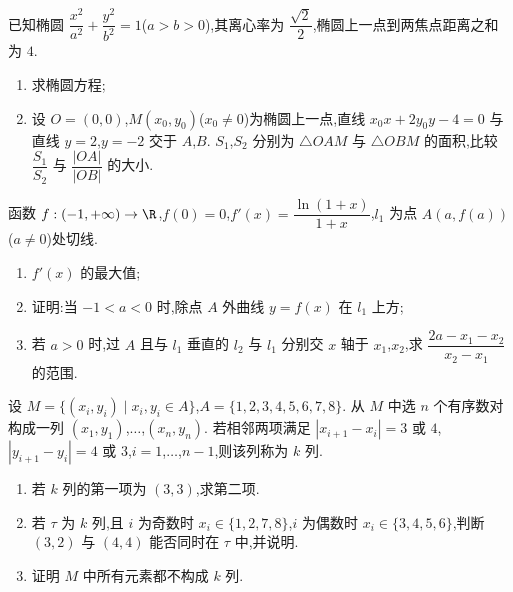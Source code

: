\begin{problem}
已知椭圆 \(\dfrac{x^2}{a^2}+\dfrac{y^2}{b^2}=1\)(\(a>b>0\)),其离心率为 \(\dfrac{\sqrt{2}}{2}\),椭圆上一点到两焦点距离之和为 \(4\).

\begin{enumerate}
\item 求椭圆方程;
\item 设 \(O=(0,0)\),\(M(x_0,y_0)\)(\(x_0\ne0\))为椭圆上一点,直线 \(x_0x+2y_0y-4=0\) 与直线 \(y=2\),\(y=-2\) 交于 \(A\),\(B\). \(S_1\),\(S_2\) 分别为 \(\triangle OAM\) 与 \(\triangle OBM\) 的面积,比较 \(\dfrac{S_1}{S_2}\) 与 \(\dfrac{|OA|}{|OB|}\) 的大小.
\end{enumerate}
\end{problem}

\begin{problem}
函数 \(f:(-1,+\infty)\to\R\),\(f(0)=0\),\(f'(x)=\dfrac{\ln(1+x)}{1+x}\),\(l_1\) 为点 \(A(a,f(a))\)(\(a\ne0\))处切线.

\begin{enumerate}
    \item \(f'(x)\) 的最大值;
    \item 证明:当 \(-1<a<0\) 时,除点 \(A\) 外曲线 \(y=f(x)\) 在 \(l_1\) 上方;
    \item 若 \(a>0\) 时,过 \(A\) 且与 \(l_1\) 垂直的 \(l_2\) 与 \(l_1\) 分别交 \(x\) 轴于 \(x_1\),\(x_2\),求 \(\dfrac{2a-x_1-x_2}{x_2-x_1}\) 的范围.
\end{enumerate}
\end{problem}

\begin{problem}
设 \(M=\{(x_i,y_i)\mid x_i,y_i\in A\}\),\(A=\{1,2,3,4,5,6,7,8\}\). 从 \(M\) 中选 \(n\) 个有序数对构成一列 \((x_1,y_1)\),\(\dots\),\((x_n,y_n)\). 若相邻两项满足 \(|x_{i+1}-x_i|=3\text{\ 或\ }4\),\(|y_{i+1}-y_i|=4\text{\ 或\ }3\),\(i=1\),\(\dots\),\(n-1\),则该列称为 \(k\) 列.

\begin{enumerate}
    \item 若 \(k\) 列的第一项为 \((3,3)\),求第二项.
    \item 若 \(\tau\) 为 \(k\) 列,且 \(i\) 为奇数时 \(x_i\in\{1,2,7,8\}\),\(i\) 为偶数时 \(x_i\in\{3,4,5,6\}\),判断 \((3,2)\) 与 \((4,4)\) 能否同时在 \(\tau\) 中,并说明.
    \item 证明 \(M\) 中所有元素都不构成 \(k\) 列.
\end{enumerate}
\end{problem}

